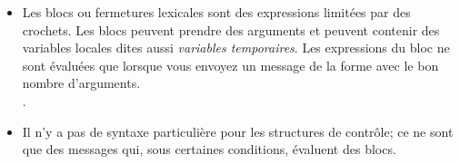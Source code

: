 \documentclass[a4paper,10pt,twoside]{book}
\begin{document}
\begin{itemize}
\item	Les blocs ou fermetures lexicales sont des expressions limitées par des crochets.
		Les blocs peuvent prendre des arguments et peuvent contenir
        des variables locales dites aussi \emph{variables temporaires}.
		Les expressions du bloc ne sont évaluées que lorsque
        vous envoyez un message de la forme  avec le bon nombre d'arguments.\\
		.

\item	Il n'y a pas de syntaxe particulière pour les structures
  de contrôle; ce ne sont que des messages qui, sous certaines conditions, évaluent des blocs.\\

\end{itemize}

\ifx\wholebook\relax\else
\end{document}

